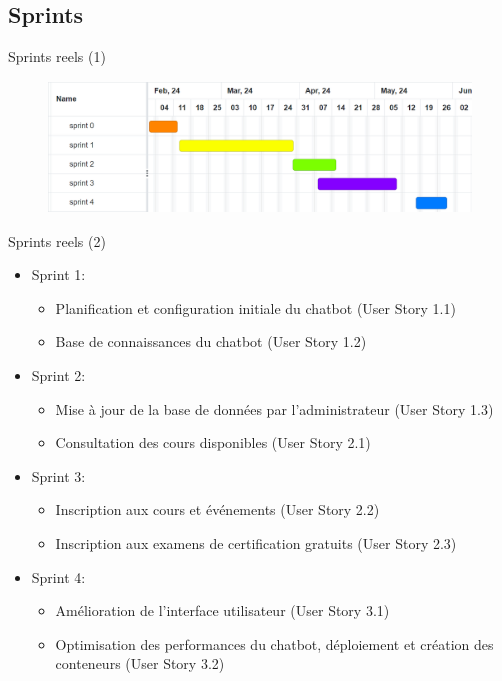 \documentclass{beamer}
\begin{document}
\subsection{Sprints}
\begin{frame}{Sprints reels (1)}
 
    \begin{figure}[htpb]
           \centering
           \includegraphics[height=3.5cm]{pic/gantt-reel.png}
       \end{figure}
   \end{frame}

   \begin{frame}{Sprints reels (2)}
 
    \begin{itemize}
        \item Sprint 1:
        \begin{itemize}
            \item Planification et configuration initiale du chatbot (User Story 1.1)
            \item Base de connaissances du chatbot (User Story 1.2)
        \end{itemize}
        
        \item Sprint 2:
        \begin{itemize}
            \item Mise à jour de la base de données par l’administrateur (User Story 1.3)
            \item Consultation des cours disponibles (User Story 2.1)
        \end{itemize}
        
        \item Sprint 3:
        \begin{itemize}
            \item Inscription aux cours et événements (User Story 2.2)
            \item Inscription aux examens de certification gratuits (User Story 2.3)
        \end{itemize}
        
        \item Sprint 4:
        \begin{itemize}
            \item Amélioration de l’interface utilisateur (User Story 3.1)
            \item Optimisation des performances du chatbot, déploiement et création des conteneurs (User Story 3.2)
        \end{itemize}
    \end{itemize}
    
   \end{frame}
\end{document}
